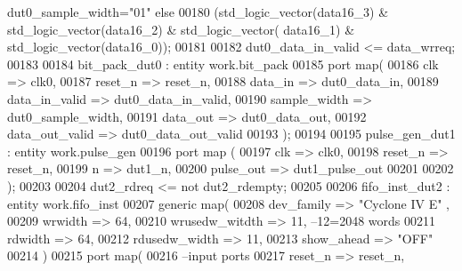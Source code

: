 \begin{DoxyCode}
{      dut0_sample_width}\textcolor{vhdlchar}{=}\textcolor{vhdllogic}{"01"} \textcolor{keywordflow}{else} 
00180                      \textcolor{vhdlchar}{(}\textcolor{comment}{std\_logic\_vector}\textcolor{vhdlchar}{(}\textcolor{vhdlchar}{data16_3}\textcolor{vhdlchar}{)} \textcolor{vhdlchar}{&} \textcolor{comment}{std\_logic\_vector}\textcolor{vhdlchar}{(}\textcolor{vhdlchar}{data16_2}\textcolor{vhdlchar}{)} \textcolor{vhdlchar}{&} \textcolor{comment}{std\_logic\_vector}\textcolor{vhdlchar}{(}\textcolor{vhdlchar}{
      data16_1}\textcolor{vhdlchar}{)} \textcolor{vhdlchar}{&} \textcolor{comment}{std\_logic\_vector}\textcolor{vhdlchar}{(}\textcolor{vhdlchar}{data16_0}\textcolor{vhdlchar}{)}\textcolor{vhdlchar}{)}; 
00181   
00182   \textcolor{vhdlchar}{dut0_data_in_valid} \textcolor{vhdlchar}{<=} \textcolor{vhdlchar}{data_wrreq};
00183   
00184   bit\_pack\_dut0 : \textcolor{keywordflow}{entity} work.bit_pack 
00185 \textcolor{keywordflow}{port} \textcolor{keywordflow}{map}(
00186         clk             => clk0,
00187         reset_n         => reset_n,
00188         data_in         => dut0_data_in,
00189         data_in_valid   => dut0_data_in_valid,
00190         sample_width    => dut0_sample_width,
00191         data_out        => dut0_data_out,
00192         data_out_valid  => dut0_data_out_valid
00193 \textcolor{vhdlchar}{)};  
00194 
00195 pulse\_gen\_dut1 : \textcolor{keywordflow}{entity} work.pulse_gen
00196 \textcolor{keywordflow}{port} \textcolor{keywordflow}{map} (
00197          clk         => clk0,
00198          reset_n     => reset_n,
00199          n           => dut1_n, 
00200          pulse\_out   => dut1_pulse_out
00201                
00202 \textcolor{vhdlchar}{)};
00203 
00204 \textcolor{vhdlchar}{dut2_rdreq} \textcolor{vhdlchar}{<=} \textcolor{keywordflow}{not} \textcolor{vhdlchar}{dut2_rdempty};
00205 
00206 fifo\_inst\_dut2 : \textcolor{keywordflow}{entity} work.fifo_inst
00207   \textcolor{keywordflow}{generic} \textcolor{keywordflow}{map}(
00208          dev_family     => \textcolor{keyword}{"Cyclone IV E"}  ,
00209          wrwidth         => \textcolor{vhdllogic}{64},
00210          wrusedw_witdth  => \textcolor{vhdllogic}{11},\textcolor{keyword}{ --12=2048 words }
00211          rdwidth         => \textcolor{vhdllogic}{64},
00212          rdusedw_width   => \textcolor{vhdllogic}{11},
00213          show_ahead      => \textcolor{keyword}{"OFF"}
00214   \textcolor{vhdlchar}{)} 
00215   \textcolor{keywordflow}{port} \textcolor{keywordflow}{map}(
00216 \textcolor{keyword}{      --input ports }
00217       reset_n       => reset_n,

\end{DoxyCode}
